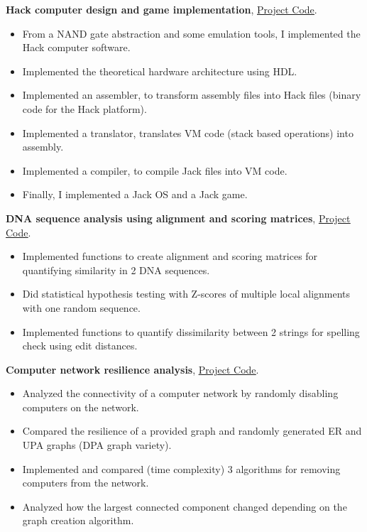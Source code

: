 \documentclass[a4paper,10pt]{article}
\newcommand{\ulink}[2]{\href{#1}{\underline{#2}}}
\begin{document}
\textbf{Hack computer design and game implementation}, \ulink{https://github.com/rokobo/From-Nand-gates-to-Tetris-implementation}{Project Code}.
\begin{itemize}[itemsep=0pt]
  \item From a NAND gate abstraction and some emulation tools, I implemented the Hack computer software.
  \item Implemented the theoretical hardware architecture using HDL.
  \item Implemented an assembler, to transform assembly files into Hack files (binary code for the Hack platform).
  \item Implemented a translator, translates VM code (stack based operations) into assembly.
  \item Implemented a compiler, to compile Jack files into VM code.
  \item Finally, I implemented a Jack OS and a Jack game.
\end{itemize}
\textbf{DNA sequence analysis using alignment and scoring matrices}, \ulink{https://github.com/rokobo/DNA-Sequence-Analysis}{Project Code}.
\begin{itemize}[itemsep=0pt]
  \item Implemented functions to create alignment and scoring matrices for quantifying similarity in 2 DNA sequences.
  \item Did statistical hypothesis testing with Z-scores of multiple local alignments with one random sequence.
  \item Implemented functions to quantify dissimilarity between 2 strings for spelling check using edit distances.
\end{itemize}
\textbf{Computer network resilience analysis}, \ulink{https://github.com/rokobo/Computer-Network-Resilience-Analysis}{Project Code}.
\begin{itemize}[itemsep=0pt]
  \item Analyzed the connectivity of a computer network by randomly disabling computers on the network.
  \item Compared the resilience of a provided graph and randomly generated ER and UPA graphs (DPA graph variety).
  \item Implemented and compared (time complexity) 3 algorithms for removing computers from the network.
  \item Analyzed how the largest connected component changed depending on the graph creation algorithm.
\end{itemize}
\end{document}
